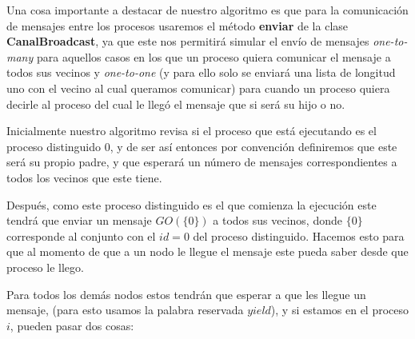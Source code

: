 Una cosa importante a destacar de nuestro algoritmo es que para la comunicación de mensajes entre los procesos usaremos el método \textbf{enviar} de la clase \textbf{CanalBroadcast}, ya que este nos permitirá simular el envío de mensajes \textit{one-to-many} para aquellos casos en los que un proceso quiera comunicar el mensaje a todos sus vecinos y \textit{one-to-one} (y para ello solo se enviará una lista de longitud uno con el vecino al cual queramos comunicar) para cuando un proceso quiera decirle al proceso del cual le llegó el mensaje que si será su hijo o no. 

Inicialmente nuestro algoritmo revisa si el proceso que está ejecutando es el proceso distinguido \(0\), y de ser así entonces por convención definiremos que este será su propio padre, y que esperará un número de mensajes correspondientes a todos los vecinos que este tiene.

Después, como este proceso distinguido es el que comienza la ejecución este tendrá que enviar un mensaje \(GO(\{0\})\) a todos sus vecinos, donde \(\{0\}\)  corresponde al conjunto con el \(id = 0\) del proceso distinguido. Hacemos esto para que al momento de que a un nodo le llegue el mensaje este pueda saber desde que proceso le llego.

Para todos los demás nodos estos tendrán que esperar a que les llegue un mensaje, (para esto usamos la palabra reservada \(yield\)), y si estamos en el proceso \(i\), pueden pasar dos cosas: 

